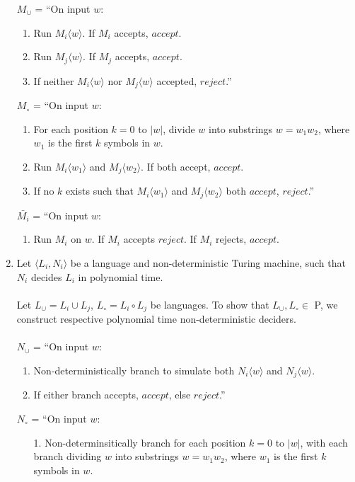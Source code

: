 \documentclass[11pt]{article}
\renewcommand{\indent}{\hspace{1em}}
\begin{document}
\begin{enumerate}[7.1]
    $M_\cup$ = ``On input $w$:
    \begin{enumerate}[label=\arabic*.]
      \item Run $M_i\langle w \rangle$. If $M_i$ accepts, $accept$.
      \item Run $M_j\langle w \rangle$. If $M_j$ accepts, $accept$.
      \item If neither $M_i\langle w \rangle$ nor $M_j\langle w \rangle$ accepted, $reject$.''
    \end{enumerate}
    $M_\circ$ = ``On input $w$:
    \begin{enumerate}[label=\arabic*.]
      \item For each position $k = 0$ to $|w|$, divide $w$ into substrings $w = w_1w_2$, where $w_1$ is the first $k$ symbols in $w$.
      \item \indent Run $M_i\langle w_1 \rangle$ and $M_j\langle w_2 \rangle$. If both accept, $accept$.
      \item If no $k$ exists such that $M_i\langle w_1 \rangle$ and $M_j\langle w_2 \rangle$ both $accept$, $reject$.''
    \end{enumerate}
    $\bar{M_i}$ = ``On input $w$:
    \begin{enumerate}[label=\arabic*.]
      \item Run $M_i$ on $w$. If $M_i$ accepts $reject$. If $M_i$ rejects, $accept$.
    \end{enumerate}
  \item Let $\langle L_i, N_i \rangle$ be a language and non-deterministic Turing machine, such that $N_i$ decides $L_i$ in polynomial time. \\\\
    Let $L_\cup = L_i \cup L_j$, $L_\circ = L_i \circ L_j$ be languages. To show that $L_\cup, L_\circ \in$ P, we construct respective polynomial time non-deterministic deciders. \\\\
    $N_\cup$ = ``On input $w$:
    \begin{enumerate}[label=\arabic*.]
      \item Non-deterministically branch to simulate both $N_i\langle w \rangle$ and $N_j\langle w \rangle$.
      \item If either branch accepts, $accept$, else $reject$.''
    \end{enumerate}
    $N_\circ$ = ``On input $w$:
    \begin{enumerate}
      \item[1.] Non-determinsitically branch for each position $k = 0$ to $|w|$, with each branch dividing $w$ into substrings $w = w_1w_2$, where $w_1$ is the first $k$ symbols in $w$.

\end{enumerate}
\end{enumerate}
\end{document}
